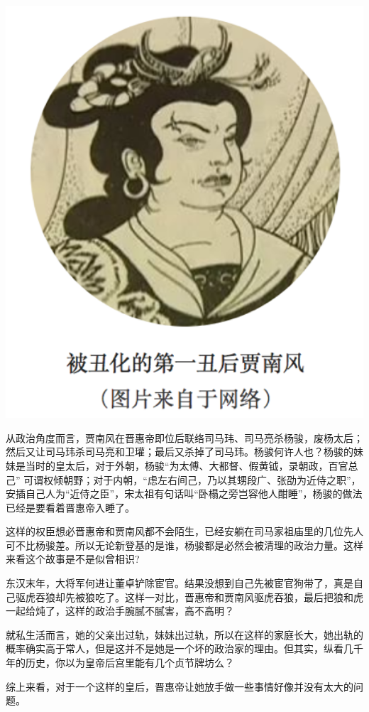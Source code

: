 \documentclass[]{book}
\begin{document}
\includegraphics[width=5.79in]{images/his7}

从政治角度而言，贾南风在晋惠帝即位后联络司马玮、司马亮杀杨骏，废杨太后；然后又让司马玮杀司马亮和卫瓘；最后又杀掉了司马玮。杨骏何许人也？杨骏的妹妹是当时的皇太后，对于外朝，杨骏``为太傅、大都督、假黄钺，录朝政，百官总己'' 可谓权倾朝野；对于内朝，``虑左右间己，乃以其甥段广、张劭为近侍之职''，安插自己人为``近侍之臣''，宋太祖有句话叫``卧榻之旁岂容他人酣睡''，杨骏的做法已经是要看着晋惠帝入睡了。

这样的权臣想必晋惠帝和贾南风都不会陌生，已经安躺在司马家祖庙里的几位先人可不比杨骏差。所以无论新登基的是谁，杨骏都是必然会被清理的政治力量。这样来看这个故事是不是似曾相识?

东汉末年，大将军何进让董卓铲除宦官。结果没想到自己先被宦官狗带了，真是自己驱虎吞狼却先被狼吃了。这样一对比，晋惠帝和贾南风驱虎吞狼，最后把狼和虎一起给炖了，这样的政治手腕腻不腻害，高不高明？

就私生活而言，她的父亲出过轨，妹妹出过轨，所以在这样的家庭长大，她出轨的概率确实高于常人，但是这并不是她是一个坏的政治家的理由。但其实，纵看几千年的历史，你以为皇帝后宫里能有几个贞节牌坊么？

综上来看，对于一个这样的皇后，晋惠帝让她放手做一些事情好像并没有太大的问题。
\end{document}
